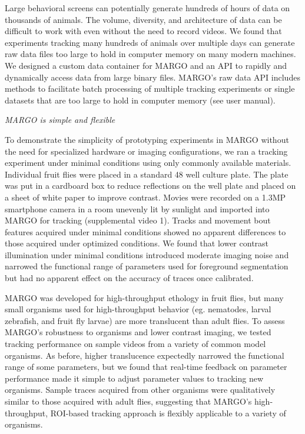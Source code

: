 \documentclass[10pt]{article}
\begin{document}
\begin{multicols}{2}
Large behavioral screens can potentially generate hundreds of hours of data on thousands of animals. The volume, diversity, and architecture of data can be difficult to work with even without the need to record videos. We found that experiments tracking many hundreds of animals over multiple days can generate raw data files too large to hold in computer memory on many modern machines. We designed a custom data container for MARGO and an API to rapidly and dynamically access data from large binary files. MARGO's raw data API includes methods to facilitate batch processing of multiple tracking experiments or single datasets that are too large to hold in computer memory (see user manual). 

\textit{MARGO is simple and flexible}

To demonstrate the simplicity of prototyping experiments in MARGO without the need for specialized hardware or imaging configurations, we ran a tracking experiment under minimal conditions using only commonly available materials.  Individual fruit flies were placed in a standard 48 well culture plate. The plate was put in a cardboard box to reduce reflections on the well plate and placed on a sheet of white paper to improve contrast. Movies were recorded on a 1.3MP smartphone camera in a room unevenly lit by sunlight and imported into MARGO for tracking (supplemental video 1). Tracks and movement bout features acquired under minimal conditions showed no apparent differences to those acquired under optimized conditions. We found that lower contrast illumination under minimal conditions introduced moderate imaging noise and narrowed the functional range of parameters used for foreground segmentation but had no apparent effect on the accuracy of traces once calibrated.

MARGO was developed for high-throughput ethology in fruit flies, but many small organisms used for high-throughput behavior (eg. nematodes, larval zebrafish, and fruit fly larvae) are more translucent than adult flies. To assess MARGO’s robustness to organisms and lower contrast imaging, we tested tracking performance on sample videos from a variety of common model organisms. As before, higher translucence expectedly narrowed the functional range of some parameters, but we found that real-time feedback on parameter performance made it simple to adjust parameter values to tracking new organisms. Sample traces acquired from other organisms were qualitatively similar to those acquired with adult flies, suggesting that MARGO’s high-throughput, ROI-based tracking approach is flexibly applicable to a variety of organisms.


\end{multicols}
\end{document}
